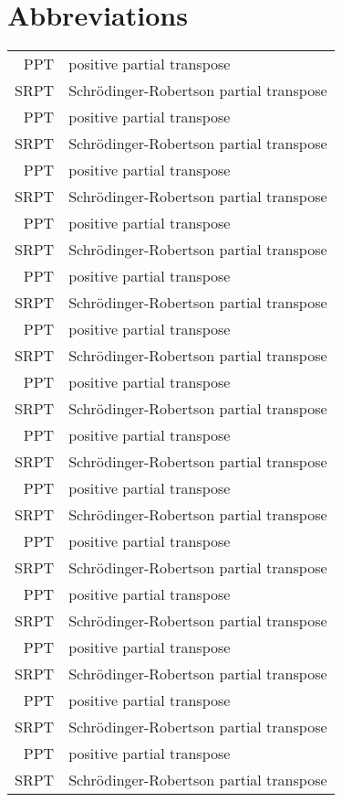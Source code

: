 \chapter*{Abbreviations} 

\begin{longtable}{rl}
PPT & positive partial transpose\\
SRPT & Schr\"odinger-Robertson partial transpose\\
PPT & positive partial transpose\\
SRPT & Schr\"odinger-Robertson partial transpose\\
PPT & positive partial transpose\\
SRPT & Schr\"odinger-Robertson partial transpose\\
PPT & positive partial transpose\\
SRPT & Schr\"odinger-Robertson partial transpose\\
PPT & positive partial transpose\\
SRPT & Schr\"odinger-Robertson partial transpose\\
PPT & positive partial transpose\\
SRPT & Schr\"odinger-Robertson partial transpose\\
PPT & positive partial transpose\\
SRPT & Schr\"odinger-Robertson partial transpose\\
PPT & positive partial transpose\\
SRPT & Schr\"odinger-Robertson partial transpose\\
PPT & positive partial transpose\\
SRPT & Schr\"odinger-Robertson partial transpose\\
PPT & positive partial transpose\\
SRPT & Schr\"odinger-Robertson partial transpose\\
PPT & positive partial transpose\\
SRPT & Schr\"odinger-Robertson partial transpose\\
PPT & positive partial transpose\\
SRPT & Schr\"odinger-Robertson partial transpose\\
PPT & positive partial transpose\\
SRPT & Schr\"odinger-Robertson partial transpose\\
PPT & positive partial transpose\\
SRPT & Schr\"odinger-Robertson partial transpose\\

\end{longtable}
